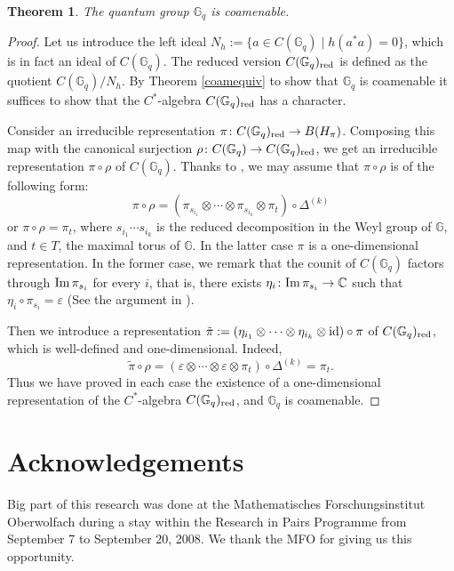 \documentclass[12pt]{amsart}
\newtheorem{theorem}{Theorem}[section]
\theoremstyle{definition}
\theoremstyle{remark}
\numberwithin{equation}{section}
\begin{document}
\begin{theorem}
The quantum group $\mathbb{G}_q$ is coamenable.
\end{theorem}
\begin{proof}
Let us introduce the left ideal $N_h:=\{a\in C(\mathbb{G}_q)\mid h(a^*a)=0\}$, which is in fact an ideal of 
$C(\mathbb{G}_q)$. The reduced version  $C(\mathbb{G}_q)_{\rm red}$ is defined as the quotient 
$C(\mathbb{G}_q)/N_h$. By Theorem \ref{coamequiv} to show that $\mathbb{G}_q$ is coamenable it suffices to show 
that the $C^*$-algebra $C(\mathbb{G}_q)_{\rm red}$ has a character.

Consider an irreducible representation $\pi\colon C(\mathbb{G}_q)_{\rm red}\to B(H_\pi)$. Composing
this map with the canonical surjection $\rho\colon C(\mathbb{G}_q)\to C(\mathbb{G}_q)_{\rm red}$,
we get an irreducible representation $\pi\circ\rho$ of $C(\mathbb{G}_q)$. Thanks to \cite[Theorem
6.2.7 (3), \S3]{korogodski+soibelman98}, we may assume that $\pi\circ\rho$ is of the following
form:
\[
\pi\circ\rho = (\pi_{s_{i_1}}\otimes\cdots\otimes\pi_{s_{i_k}}\otimes\pi_t)\circ\Delta^{(k)}
\]
or $\pi\circ\rho=\pi_t$, where $s_{i_1}\cdots s_{i_k}$ is the reduced decomposition in the Weyl group of $\mathbb{G}$, and $t\in
T$, the maximal torus of $\mathbb{G}$. In the latter case $\pi$ is a one-dimensional representation. In the former case, we
remark that the counit of $C(\mathbb{G}_q)$ factors through $\textup{Im}\, \pi_{s_i}$ for every $i$, that is, there exists
$\eta_i\colon \textup{Im}\, \pi_{s_i}\rightarrow \mathbb{C}$ such that $\eta_i\circ\pi_{s_i}=\varepsilon$ (See the argument in
\cite[p. 294]{tomatsu07}).

Then we introduce a representation
$\tilde{\pi}:=(\eta_{i_1}\otimes\cdots\otimes\eta_{i_k}\otimes\textup{id})\circ\pi$ of
$C(\mathbb{G}_q)_{\rm red}$, which is well-defined and one-dimensional. Indeed,
\[
\tilde{\pi}\circ \rho =(\varepsilon\otimes\cdots\otimes\varepsilon\otimes\pi_t)\circ\Delta^{(k)} =\pi_t.
\]
Thus we have proved in each case the existence of a one-dimensional representation of the $C^*$-algebra $C(\mathbb{G}_q)_{\rm
red}$, and $\mathbb{G}_q$ is coamenable.
\end{proof}

\section*{Acknowledgements}

Big part of this research was done at the Mathematisches Forschungsinstitut Oberwolfach
during a  stay within the Research in Pairs Programme from September 7 to September 20, 2008. We thank the MFO for giving us this opportunity.
\end{document}
